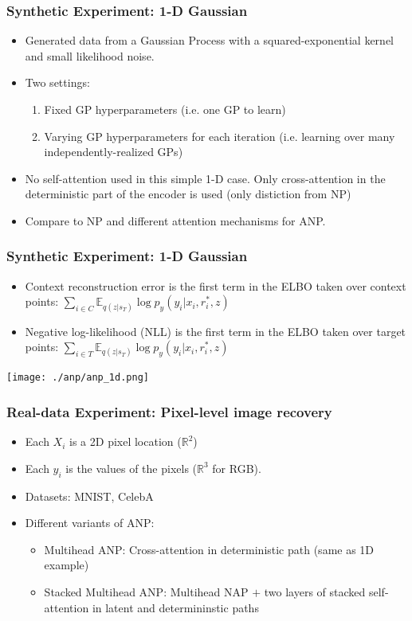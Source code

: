 \documentclass[t]{beamer}
\begin{document}
\begin{frame}
  \frametitle{Synthetic Experiment: 1-D Gaussian} 
  \begin{itemize}
  \item Generated data from a Gaussian Process with a squared-exponential kernel and small likelihood noise.
  \item Two settings:
    \begin{enumerate}
    \item Fixed GP hyperparameters (i.e. one GP to learn)
    \item Varying GP hyperparameters for each iteration (i.e. learning over many independently-realized GPs)
    \end{enumerate}
  \item No self-attention used in this simple 1-D case. Only cross-attention in the deterministic part of the encoder is used (only distiction from NP)
    \item Compare to NP and different attention mechanisms for ANP.
  \end{itemize}
\end{frame}

\begin{frame}
  \frametitle{Synthetic Experiment: 1-D Gaussian} 
  \begin{itemize}
  \item Context reconstruction error is the first term in the ELBO taken over context points: \( \sum_{i \in C} \mathbb E_{q(z | s_T)} \log p_y(y_i | x_i, r_i^*, z) \)
  \item Negative log-likelihood (NLL) is the first term in the ELBO taken over target points: \( \sum_{i \in T} \mathbb E_{q(z | s_T)} \log p_y(y_i | x_i, r_i^*, z) \)
  \end{itemize}
  \texttt{[image: ./anp/anp\_1d.png]}
\end{frame}

\begin{frame}
  \frametitle{Real-data Experiment: Pixel-level image recovery} 
  \begin{itemize}
  \item Each $X_i$ is a 2D pixel location ($\mathbb R^2$)
  \item Each $y_i$ is the values of the pixels ($\mathbb R^3$ for RGB).
  \item Datasets: MNIST, CelebA
  \item Different variants of ANP:
    \begin{itemize}
    \item Multihead ANP: Cross-attention in deterministic path (same as 1D example)
    \item Stacked Multihead ANP: Multihead NAP $+$ two layers of stacked self-attention in latent and determininstic paths
    \end{itemize}
\end{itemize}
\end{frame}
\end{document}
